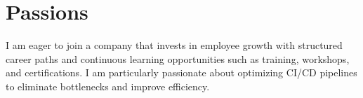 \documentclass[a4paper,10pt]{article}
\begin{document}
\vspace{5pt}
\section*{Passions}
I am eager to join a company that invests in employee growth with structured career paths and continuous learning opportunities such as training, workshops, and certifications. I am particularly passionate about optimizing CI/CD pipelines to eliminate bottlenecks and improve efficiency.
\end{document}
